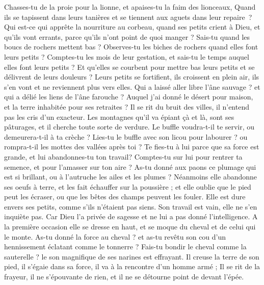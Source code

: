 \begin{multicols}{2}
\VerseOne{}Chasses-tu de la proie pour la lionne, et apaises-tu la faim des lionceaux,
Quand ils se tapissent dans leurs tanières et se tiennent aux aguets dans leur repaire ?
Qui est-ce qui apprête la nourriture au corbeau, quand ses petits crient à Dieu, et qu'ils vont errants, parce qu'ils n'ont point de quoi manger ?
Sais-tu quand les boucs de rochers mettent bas ? Observes-tu les biches de rochers quand elles font leurs petits ?
Comptes-tu les mois de leur gestation, et sais-tu le temps auquel elles font leurs petits ?
Et qu'elles se courbent pour mettre bas leurs petits et se délivrent de leurs douleurs ?
Leurs petits se fortifient, ils croissent en plein air, ils s’en vont et ne reviennent plus vers elles.
Qui a laissé aller libre l’âne sauvage ? et qui a délié les liens de l’âne farouche ?
Auquel j’ai donné le désert pour maison, et la terre inhabitée pour ses retraites ?
Il se rit du bruit des villes, il n'entend pas les cris d'un exacteur.
Les montagnes qu'il va épiant çà et là, sont ses pâturages, et il cherche toute sorte de verdure. 
Le buffle voudra-t-il te servir, ou demeurera-t-il à ta crèche ? 
Lies-tu le buffle avec son licou pour labourer ? ou rompra-t-il les mottes des vallées après toi ? 
Te fies-tu à lui parce que sa force est grande, et lui abandonnes-tu ton travail? 
Comptes-tu sur lui pour rentrer ta semence, et pour l'amasser sur ton aire ? 
As-tu donné aux paons ce plumage qui est si brillant, ou à l'autruche les ailes et les plumes ? 
Néanmoins elle abandonne ses oeufs à terre, et les fait échauffer sur la poussière ;
et elle oublie que le pied peut les écraser, ou que les bêtes des champs peuvent les fouler. 
Elle est dure envers ses petits, comme s’ils n’étaient pas siens. Son travail est vain, elle ne s’en inquiète pas.
Car Dieu l'a privée de sagesse et ne lui a pas donné l'intelligence.
A la première occasion elle se dresse en haut, et se moque du cheval et de celui qui le monte. 
As-tu donné la force au cheval ? et as-tu revêtu son cou d'un hennissement éclatant comme le tonnerre ? 
Fais-tu bondir le cheval comme la sauterelle ? le son magnifique de ses narines est effrayant.
Il creuse la terre de son pied, il s'égaie dans sa force, il va à la rencontre d'un homme armé ;
Il se rit de la frayeur, il ne s'épouvante de rien, et il ne se détourne point de devant l'épée.

\end{multicols}
